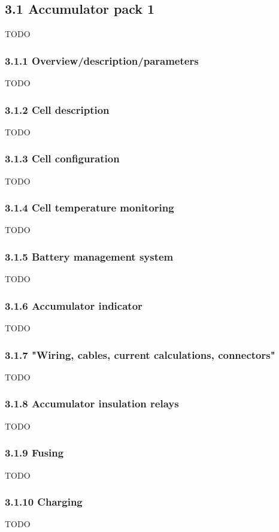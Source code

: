\documentclass{article}
\begin{document}
\subsection*{3.1 Accumulator pack 1}
TODO

\subsubsection*{3.1.1 Overview/description/parameters}
TODO

\subsubsection*{3.1.2 Cell description}
TODO

\subsubsection*{3.1.3 Cell configuration}
TODO

\subsubsection*{3.1.4 Cell temperature monitoring}
TODO

\subsubsection*{3.1.5 Battery management system}
TODO

\subsubsection*{3.1.6 Accumulator indicator}
TODO

\subsubsection*{3.1.7 "Wiring, cables, current calculations, connectors"}
TODO

\subsubsection*{3.1.8 Accumulator insulation relays}
TODO

\subsubsection*{3.1.9 Fusing}
TODO

\subsubsection*{3.1.10 Charging}
TODO
\end{document}
